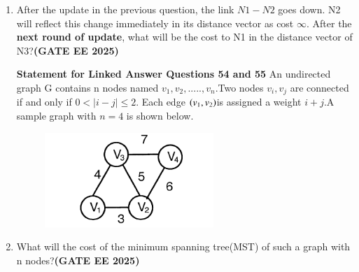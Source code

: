 \documentclass[journal,12pt,onecolumn]{IEEEtran}
\theoremstyle{remark}
\begin{document}
\begin{enumerate}
\item After the update in the previous question, the link $N1-N2$ goes down. N2 will reflect this change immediately in its distance vector as cost $\infty$. After the \textbf{next round of update}, what will be the cost to N1 in the distance vector of N3?\hfill \textbf{(GATE EE 2025)}

\begin{enumerate}
\end{enumerate}
\textbf{Statement for Linked Answer Questions 54 and 55}
An undirected graph G contains n  nodes named $v_1,v_2,.....,v_n$.Two nodes $v_i,v_j$ are connected if and only if $0<|i-j| \leq 2$. Each edge $\left(v_1,v_2\right)$is assigned a weight $i+j$.A sample graph with $n=4$ is shown below.
\begin{figure}[h]
    \centering
    \includegraphics[width=0.5\linewidth]{figs/fig11.png}
    \caption{ }
    \label{fig11}
\end{figure}
\item What will the cost of the minimum spanning tree(MST) of such a graph with n nodes?\hfill \textbf{(GATE EE 2025)}
\begin{enumerate}
   

\end{enumerate}
\end{enumerate}
\end{document}
